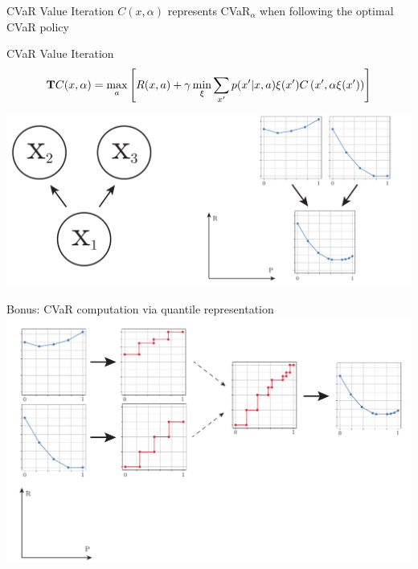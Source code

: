 \documentclass{beamer}
\begin{document}
\begin{frame}{CVaR Value Iteration}
$C(x, \alpha)$ represents CVaR$_\alpha$ when following the optimal CVaR policy

\begin{block}{CVaR Value Iteration}
\vspace{-0.5cm}
$$\mathbf{T}C(x, \alpha) = \max_a \left[ { R(x, a) + \gamma \min_{\xi} \sum_{x'} p(x'| x, a)\xi(x') C\left( {x', \alpha\xi(x')} \right)} \right]$$
\end{block}


\center
\includegraphics[width=0.8\linewidth]{gfx/acvara_mixture.pdf}

\end{frame}


\begin{frame}{Bonus: CVaR computation via quantile representation}
\center
\includegraphics[width=\linewidth]{gfx/cvar_vi_conversion.pdf}
\end{frame}
\end{document}
